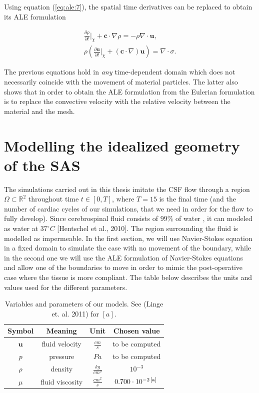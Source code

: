 \documentclass[a4paper,11pt,openright,twoside]{book}
\begin{document}
Using equation (\ref{eq:ale:7}), the spatial time derivatives can be replaced to obtain its ALE formulation

\begin{align}
\frac{\partial \rho}{\partial t} {\Big |}_\chi + \mathbf{c} \cdot \nabla \rho = - \rho \nabla \cdot \mathbf{u}, \\
\rho (\frac{\partial \mathbf{u}}{\partial t} {\Big |}_\chi + (\mathbf{c} \cdot \nabla)\mathbf{u}) = \nabla \cdot \sigma. 
\end{align}

The previous equations hold in \emph{any} time-dependent domain which does not necessarily coincide with the movement of material particles. The latter also shows that in order to obtain the ALE formulation from the Eulerian formulation is to replace the convective velocity with the relative velocity between the material and the mesh.

\newpage

\section{Modelling the idealized geometry of the SAS}



The simulations carried out in this thesis imitate the CSF flow through a region $\Omega \subset \mathbb{R}^2$ throughout time $t \in [0, T]$, where $T=15$ is the final time (and the number of cardiac cycles of our simulations, that we need in order for the flow to fully develop). Since cerebrospinal fluid consists of $99 \% $ of water \cite{linge1}, it can modeled as water at $37^{\circ} C$ [Hentschel et al., 2010]. The region surrounding the fluid is modelled as impermeable.
In the first section, we will use Navier-Stokes equation in a fixed domain to simulate the case with no movement of the boundary, while in the second one we will use the ALE formulation of Navier-Stokes equations and allow one of the boundaries to move in order to mimic the post-operative case where the tissue is more compliant. The table below describes the units and values used for the different parameters.

\begin{table}[h!]
\begin{center}
\begin{tabular}{| c | c | c | c |}
\hline
\textbf{Symbol} & \textbf{Meaning} & \textbf{Unit} & \textbf{Chosen value} \\
\hline
$\mathbf{u}$ & fluid velocity & $\frac{cm}{s}$ & to be computed \\
\hline
$p$ & pressure & $Pa$ & to be computed \\
\hline
$\rho$ & density & $\frac{kg}{cm^3}$ & $10^{-3}$ \\
\hline
$\mu$ & fluid viscosity & $\frac{cm^2}{s}$ & $0.700 \cdot 10^{-2 \, [\rm a] \, }$ \\
\hline
\end{tabular}
\end{center}
\caption{Variables and parameters of our models. See (Linge et. al. 2011) for $[a]$.}
\end{table}
\end{document}
